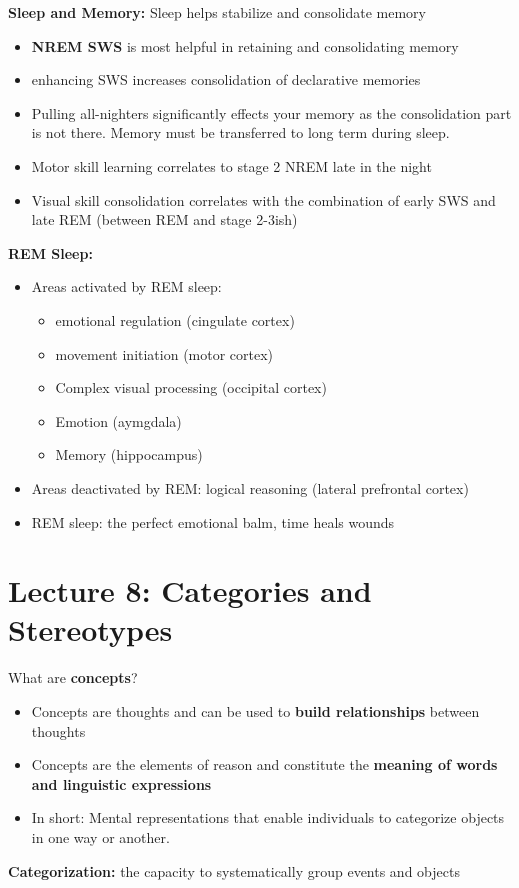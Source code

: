 \documentclass{article}
\begin{document}
\noindent\textbf{Sleep and Memory:} Sleep helps stabilize and consolidate memory
\begin{itemize}
    \item \textbf{NREM SWS} is most helpful in retaining and consolidating memory
    \item enhancing SWS increases consolidation of declarative memories
    \item Pulling all-nighters significantly effects your memory as the consolidation part is not there. Memory must be transferred to long term during sleep. 
    \item Motor skill learning correlates to stage 2 NREM late in the night
    \item Visual skill consolidation correlates with the combination of early SWS and late REM (between REM and stage 2-3ish)
\end{itemize}
\noindent\textbf{REM Sleep:}
\begin{itemize}
    \item Areas activated by REM sleep: 
    \begin{itemize}
        \item  emotional regulation (cingulate cortex)
        \item movement initiation (motor cortex) 
        \item Complex visual processing (occipital cortex) 
        \item Emotion (aymgdala)
        \item Memory (hippocampus) 
    \end{itemize}
    \item Areas deactivated by REM: logical reasoning (lateral prefrontal cortex) 
   \item REM sleep: the perfect emotional balm, time heals wounds
\end{itemize}

\section{Lecture 8: Categories and Stereotypes}
What are \textbf{concepts}? 
\begin{itemize}
    \item Concepts are thoughts and can be used to \textbf{build relationships} between thoughts
    \item Concepts are the elements of reason and constitute the \textbf{meaning of words and linguistic expressions}
    \item In short: Mental representations that enable individuals to categorize objects in one way or another.
\end{itemize}
\textbf{Categorization:} the capacity to systematically group events and objects \\
\end{document}
